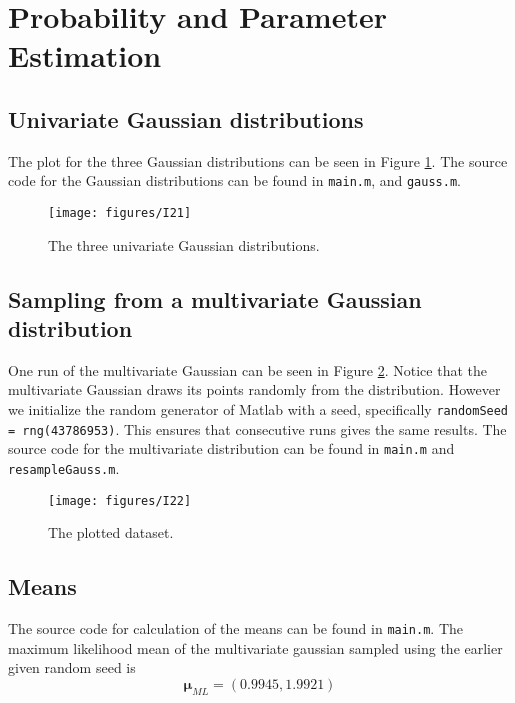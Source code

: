 \documentclass[a4paper, 11pt]{article}
\begin{document}
\section{Probability and Parameter Estimation}
\label{sec:probability_and_parameter_estimation}

\subsection{Univariate Gaussian distributions}
\label{sub:univariate_Gaussian_distributions}

The plot for the three Gaussian distributions can be seen in Figure \ref{fig:I21}. The source code for the Gaussian distributions can be found in \texttt{main.m}, and \texttt{gauss.m}.
\begin{figure}[H]
    \centering
    \texttt{[image: figures/I21]}
    \caption{The three univariate Gaussian distributions.}
    \label{fig:I21}
\end{figure}

\subsection{Sampling from a multivariate Gaussian distribution}
\label{sub:sampling_from_a_multivariate_Gaussian_distributions}

One run of the multivariate Gaussian can be seen in Figure \ref{fig:I22}. Notice that the multivariate Gaussian draws its points randomly from the distribution. However we initialize the random generator of Matlab with a seed, specifically \texttt{randomSeed = rng(43786953)}. This ensures that consecutive runs gives the same results. The source code for the multivariate distribution can be found in \texttt{main.m} and \texttt{resampleGauss.m}.
\begin{figure}[H]
    \centering
    \texttt{[image: figures/I22]}
    \caption{The plotted dataset.}
    \label{fig:I22}
\end{figure}

\subsection{Means}
\label{sub:means}

The source code for calculation of the means can be found in \texttt{main.m}. The maximum likelihood mean of the multivariate gaussian sampled using the earlier given random seed is
\[
    \boldsymbol \mu_{ML} = (0.9945, 1.9921)
\]
\end{document}
